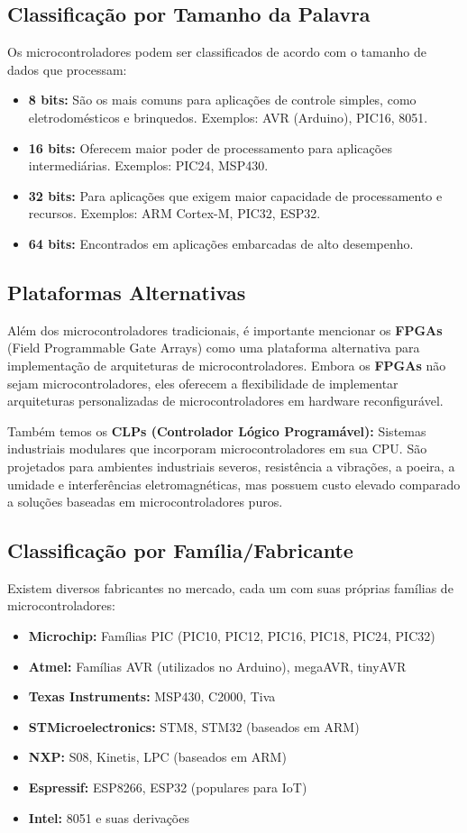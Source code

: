 \documentclass[12pt,a4paper]{book}
\begin{document}
\subsection{Classificação por Tamanho da Palavra}
Os microcontroladores podem ser classificados de acordo com o tamanho de dados que processam:
\begin{itemize}
    \item \textbf{8 bits:} São os mais comuns para aplicações de controle simples, como eletrodomésticos e brinquedos. Exemplos: AVR (Arduino), PIC16, 8051.
    \item \textbf{16 bits:} Oferecem maior poder de processamento para aplicações intermediárias. Exemplos: PIC24, MSP430.
    \item \textbf{32 bits:} Para aplicações que exigem maior capacidade de processamento e recursos. Exemplos: ARM Cortex-M, PIC32, ESP32.
    \item \textbf{64 bits:} Encontrados em aplicações embarcadas de alto desempenho.
\end{itemize}
\subsection{Plataformas Alternativas}
Além dos microcontroladores tradicionais, é importante mencionar os \textbf{FPGAs} (Field Programmable Gate Arrays) como uma plataforma alternativa para implementação de arquiteturas de microcontroladores. Embora os \textbf{FPGAs} não sejam microcontroladores, eles oferecem a flexibilidade de implementar arquiteturas personalizadas de microcontroladores em hardware reconfigurável.
\par Também temos os \textbf{CLPs (Controlador Lógico Programável):} Sistemas industriais modulares que incorporam microcontroladores em sua CPU. São projetados para ambientes industriais severos, resistência a vibrações, a poeira, a umidade e interferências eletromagnéticas, mas possuem custo elevado comparado a soluções baseadas em microcontroladores puros.
\subsection{Classificação por Família/Fabricante}
Existem diversos fabricantes no mercado, cada um com suas próprias famílias de microcontroladores:
\begin{itemize}
    \item \textbf{Microchip:} Famílias PIC (PIC10, PIC12, PIC16, PIC18, PIC24, PIC32)
    \item \textbf{Atmel:} Famílias AVR (utilizados no Arduino), megaAVR, tinyAVR
    \item \textbf{Texas Instruments:} MSP430, C2000, Tiva
    \item \textbf{STMicroelectronics:} STM8, STM32 (baseados em ARM)
    \item \textbf{NXP:} S08, Kinetis, LPC (baseados em ARM)
    \item \textbf{Espressif:} ESP8266, ESP32 (populares para IoT)
    \item \textbf{Intel:} 8051 e suas derivações
\end{itemize}
\end{document}
